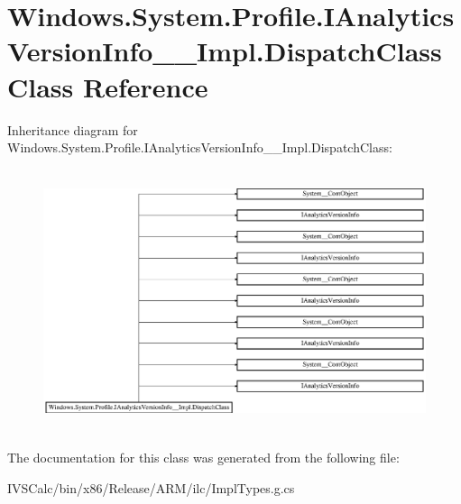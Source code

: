 \hypertarget{class_windows_1_1_system_1_1_profile_1_1_i_analytics_version_info_____impl_1_1_dispatch_class}{}\section{Windows.\+System.\+Profile.\+I\+Analytics\+Version\+Info\+\_\+\+\_\+\+Impl.\+Dispatch\+Class Class Reference}
\label{class_windows_1_1_system_1_1_profile_1_1_i_analytics_version_info_____impl_1_1_dispatch_class}
Inheritance diagram for Windows.\+System.\+Profile.\+I\+Analytics\+Version\+Info\+\_\+\+\_\+\+Impl.\+Dispatch\+Class\+:\begin{figure}[H]
\begin{center}
\leavevmode
\includegraphics[height=7.719297cm]{class_windows_1_1_system_1_1_profile_1_1_i_analytics_version_info_____impl_1_1_dispatch_class}
\end{center}
\end{figure}


The documentation for this class was generated from the following file\+:\begin{DoxyCompactItemize}
\item 
I\+V\+S\+Calc/bin/x86/\+Release/\+A\+R\+M/ilc/Impl\+Types.\+g.\+cs\end{DoxyCompactItemize}
